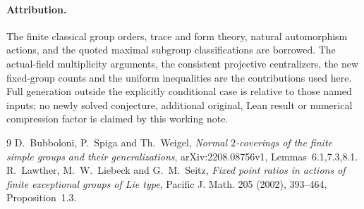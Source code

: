 \documentclass[11pt,a4paper]{article}
\begin{document}
\paragraph{Attribution.}
The finite classical group orders, trace and form theory, natural
automorphism actions, and the quoted maximal subgroup classifications
are borrowed. The actual-field multiplicity arguments, the consistent
projective centralizers, the new fixed-group counts and the uniform
inequalities are the contributions used here. Full generation outside
the explicitly conditional case is relative to those named inputs;
no newly solved conjecture, additional original, Lean result or numerical
compression factor is claimed by this working note.

\begin{thebibliography}{9}
 D.~Bubboloni, P.~Spiga and Th.~Weigel,
\emph{Normal $2$-coverings of the finite simple groups and their
generalizations}, arXiv:2208.08756v1, Lemmas~6.1,7.3,8.1.
 R.~Lawther, M.~W.~Liebeck and G.~M.~Seitz,
\emph{Fixed point ratios in actions of finite exceptional groups of Lie type},
Pacific J. Math. 205 (2002), 393--464, Proposition~1.3.
\end{thebibliography}
\end{document}
